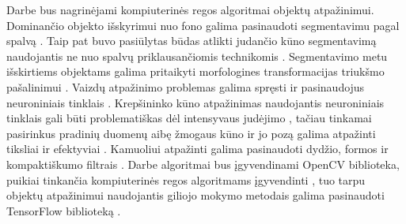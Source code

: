 \documentclass{VUMIFPSbakalaurinis}
\begin{document}
Darbe bus nagrinėjami kompiuterinės regos algoritmai objektų atpažinimui. Dominančio objekto išskyrimui nuo fono galima pasinaudoti segmentavimu pagal spalvą \cite{VERHES_LAHI_2005, SzeliskiCompVision}. Taip pat buvo pasiūlytas būdas atlikti judančio kūno segmentavimą naudojantis ne nuo spalvų priklausančiomis technikomis \cite{4717823}. Segmentavimo metu išskirtiems objektams galima pritaikyti morfologines transformacijas triukšmo pašalinimui \cite{4767941}. Vaizdų atpažinimo problemas galima spręsti ir pasinaudojus neuroniniais tinklais \cite{KhanConvVision}. Krepšininko kūno atpažinimas naudojantis neuroniniais tinklais gali būti problematiškas dėl intensyvaus judėjimo \cite{THOMAS20173}, tačiau tinkamai pasirinkus pradinių duomenų aibę žmogaus kūno ir jo pozą galima atpažinti tiksliai ir efektyviai \cite{Chen_2018_CVPR}. Kamuoliui atpažinti galima pasinaudoti dydžio, formos ir kompaktiškumo filtrais \cite{6224370}. Darbe algoritmai bus įgyvendinami OpenCV biblioteka, puikiai tinkančia kompiuterinės regos algoritmams įgyvendinti \cite{BradskiOpenCV}, tuo tarpu objektų atpažinimui naudojantis giliojo mokymo metodais galima pasinaudoti TensorFlow biblioteką \cite{ShanDeepVision, HuaMachineLearning}.

\printbibliography[heading=bibintoc]  %
\end{document}

